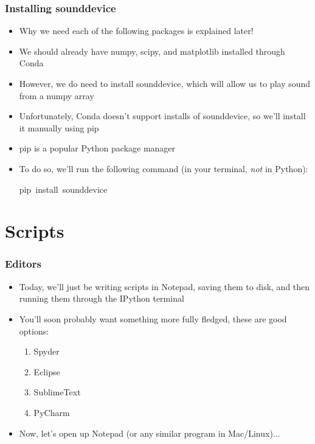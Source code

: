 \documentclass{beamer}\usepackage[]{graphicx}\usepackage[]{color}
\makeatletter
\newcommand{\hlstd}[1]{\textcolor[rgb]{0.345,0.345,0.345}{#1}}%
\newcommand{\hlkwc}[1]{\textcolor[rgb]{0.333,0.667,0.333}{#1}}%
\newenvironment{kframe}{%
 \def\at@end@of@kframe{}%
 \ifinner\ifhmode%
  \def\at@end@of@kframe{\end{minipage}}%
  \begin{minipage}{\columnwidth}%
 \fi\fi%
 \def\FrameCommand##1{\hskip\@totalleftmargin \hskip-\fboxsep
 \colorbox{shadecolor}{##1}\hskip-\fboxsep
     \hskip-\linewidth \hskip-\@totalleftmargin \hskip\columnwidth}%
 \MakeFramed {\advance\hsize-\width
   \@totalleftmargin\z@ \linewidth\hsize
   \@setminipage}}%
 {\par\unskip\endMakeFramed%
 \at@end@of@kframe}
\newenvironment{knitrout}{}{} %
\makeatother
\begin{document}
\begin{frame}[fragile]
\frametitle{Installing sounddevice}
	\begin{itemize}
		\item Why we need each of the following packages is explained later!

		\item We should already have numpy, scipy, and matplotlib installed through Conda

		\item However, we do need to install sounddevice, which will allow us to play sound from a numpy array

		\item Unfortunately, Conda doesn't support installs of sounddevice, so we'll install it manually using pip

		\item pip is a popular Python package manager

		\item To do so, we'll run the following command (in your terminal, \emph{not} in Python):

\begin{knitrout}
\color{fgcolor}\begin{kframe}
\noindent
\ttfamily
\hlstd{pip\ }\hlkwc{install\ }\hlstd{sounddevice}\hspace*{\fill}
\mbox{}
\normalfont
\end{kframe}
\end{knitrout}

	\end{itemize}
\end{frame}

\section{Scripts}

\begin{frame}
\frametitle{Editors}
\begin{itemize}
	\item Today, we'll just be writing scripts in Notepad, saving them to disk, and then running them through the IPython terminal 
	\item You'll soon probably want something more fully fledged, these are good options:
	\begin{enumerate}
		\item Spyder

		\item Eclipse

		\item SublimeText

		\item PyCharm
	\end{enumerate}

	\item Now, let's open up Notepad (or any similar program in Mac/Linux)... 
\end{itemize}
\end{frame}
\end{document}
